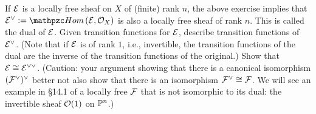 \documentclass[11pt]{book} %
\begin{document}
\begin{exr}\label{chap13exr:dual_and_double_dual_of_locally_free sheaves}
If ${\cal E}$ is a locally free sheaf on $X$ of (finite) rank $n$, the above exercise implies that $\cale^\vee:=\phom(\cale,\calo_X)$ is also a locally free sheaf of rank $n$. This is called the dual of ${\cal E}$. Given transition functions for ${\cal E}$, describe transition functions of ${\cal E}^\vee$. (Note that if ${\cal E}$ is of rank $1$, i.e., invertible, the transition functions of the dual are the inverse of the transition functions of the original.) Show that ${\cal E}\cong{\cal E}^{\vee\vee}$. (Caution: your argument showing that there is  a canonical isomorphism $({\cal F}^\vee)^\vee$ better not also show that there is an isomorphism ${\cal F}^\vee\cong {\cal F}$. We will see an example in \S 14.1 of a locally free ${\cal F}$ that is not isomorphic to its dual: the invertible sheaf ${\cal O}(1)$ on $\mathbb P^n$.)
\end{exr}
\end{document}
